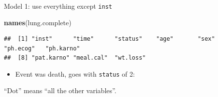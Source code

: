 \documentclass[
  ignorenonframetext,
]{beamer}
\newenvironment{Shaded}{\begin{snugshade}}{\end{snugshade}}
\newcommand{\DataTypeTok}[1]{\textcolor[rgb]{0.13,0.29,0.53}{#1}}
\newcommand{\DecValTok}[1]{\textcolor[rgb]{0.00,0.00,0.81}{#1}}
\newcommand{\FloatTok}[1]{\textcolor[rgb]{0.00,0.00,0.81}{#1}}
\newcommand{\KeywordTok}[1]{\textcolor[rgb]{0.13,0.29,0.53}{\textbf{#1}}}
\newcommand{\NormalTok}[1]{#1}
\newcommand{\OperatorTok}[1]{\textcolor[rgb]{0.81,0.36,0.00}{\textbf{#1}}}
\newcommand{\StringTok}[1]{\textcolor[rgb]{0.31,0.60,0.02}{#1}}
\providecommand{\tightlist}{%
  \setlength{\itemsep}{0pt}\setlength{\parskip}{0pt}}
\begin{document}
\begin{frame}[fragile]{Model 1: use everything except \texttt{inst}}
\protect\hypertarget{model-1-use-everything-except-inst}{}

\footnotesize

\begin{Shaded}
\begin{Highlighting}[]
\KeywordTok{names}\NormalTok{(lung.complete)}
\end{Highlighting}
\end{Shaded}

\begin{verbatim}
##  [1] "inst"      "time"      "status"    "age"       "sex"       "ph.ecog"   "ph.karno" 
##  [8] "pat.karno" "meal.cal"  "wt.loss"
\end{verbatim}

\normalsize

\begin{itemize}
\tightlist
\item
  Event was death, goes with \texttt{status} of 2:
\end{itemize}

\begin{Shaded}
\end{Shaded}

``Dot'' means ``all the other variables''.

\end{frame}
\end{document}
